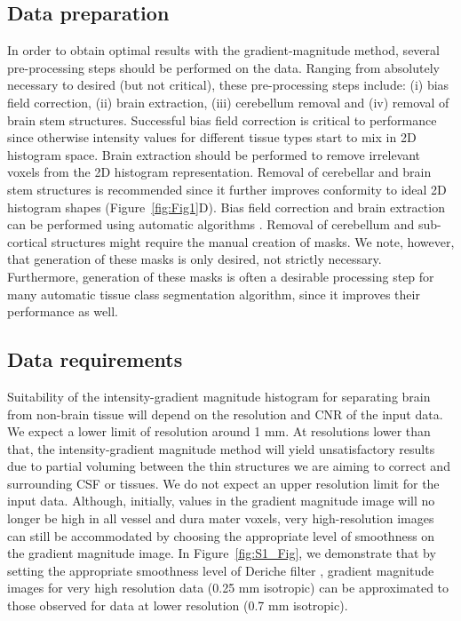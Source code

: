 \subsection{Data preparation}
In order to obtain optimal results with the gradient-magnitude method, several pre-processing steps should be performed on the data. Ranging from absolutely necessary to desired (but not critical), these pre-processing steps include: (i) bias field correction, (ii) brain extraction, (iii) cerebellum removal and (iv) removal of brain stem structures. Successful bias field correction is critical to performance since otherwise intensity values for different tissue types start to mix in 2D histogram space. Brain extraction should be performed to remove irrelevant voxels from the 2D histogram representation. Removal of cerebellar and brain stem structures is recommended since it further improves conformity to ideal 2D histogram shapes (Figure~\ref{fig:Fig1}D). Bias field correction and brain extraction can be performed using automatic algorithms \parencite{Smith2002, Ashburner2005}. Removal of cerebellum and sub-cortical structures might require the manual creation of masks. We note, however, that generation of these masks is only desired, not strictly necessary. Furthermore, generation of these masks is often a desirable processing step for many automatic tissue class segmentation algorithm, since it improves their performance as well.

\subsection{Data requirements}
Suitability of the intensity-gradient magnitude histogram for separating brain from non-brain tissue will depend on the resolution and CNR of the input data. We expect a lower limit of resolution around 1 mm. At resolutions lower than that, the intensity-gradient magnitude method will yield unsatisfactory results due to partial voluming between the thin structures we are aiming to correct and surrounding CSF or tissues. We do not expect an upper resolution limit for the input data. Although, initially, values in the gradient magnitude image will no longer be high in all vessel and dura mater voxels, very high-resolution images can still be accommodated by choosing the appropriate level of smoothness on the gradient magnitude image. In Figure~\ref{fig:S1_Fig}, we demonstrate that by setting the appropriate smoothness level of Deriche filter \parencite{Deriche1987}, gradient magnitude images for very high resolution data (0.25 mm isotropic) \parencite{250micron_data, Lusebrink2017} can be approximated to those observed for data at lower resolution (0.7 mm isotropic).


